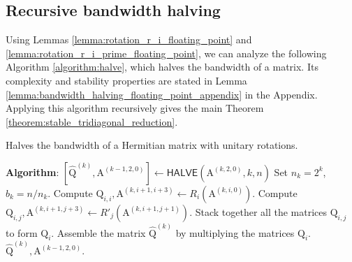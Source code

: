 \documentclass{article}
\newcommand\matA{\boldsymbol{\mathrm{A}}}
\newcommand\matQ{\boldsymbol{\mathrm{Q}}}
\newcommand\matQhat{\widehat{\boldsymbol{\mathrm{Q}}}}
\newcommand{\HALVE}{\mathsf{HALVE}}
\begin{document}
\subsection{Recursive bandwidth halving}
Using Lemmas \ref{lemma:rotation_r_i_floating_point} and \ref{lemma:rotation_r_i_prime_floating_point}, we can analyze the following Algorithm \ref{algorithm:halve}, which halves the bandwidth of a matrix. Its complexity and stability properties are stated in Lemma \ref{lemma:bandwidth_halving_floating_point_appendix} in the Appendix.
Applying this algorithm recursively gives the main Theorem \ref{theorem:stable_tridiagonal_reduction}.
\begin{algorithm}[htb]
    \caption{Halves the bandwidth of a Hermitian matrix with unitary rotations.}
    \label{algorithm:halve}
    \small
    \begin{algorithmic}[1]
        \Statex \textbf{Algorithm}: $[\matQhat^{(k)},\matA^{(k-1,2,0)}]\leftarrow \HALVE(\matA^{(k,2,0)},k,n)$
        \State Set $n_k=2^k$, $b_k=n/n_k$.
            \State Compute $\matQ_{i,i},\matA^{(k,i+1,i+3)} \leftarrow R_i(\matA^{(k,i,0)})$.
                \State Compute $\matQ_{i,j},\matA^{(k,i+1,j+3)} \leftarrow R'_j(\matA^{(k,i+1,j+1)})$.
            \EndFor
            \State Stack together all the matrices $\matQ_{i,j}$ to form $\matQ_i$.
        \EndFor
        \State Assemble the matrix $\matQhat^{(k)}$ by multiplying the matrices $\matQ_{i}$.
        \State \Return $\matQhat^{(k)},\matA^{(k-1,2,0)}$.
    \end{algorithmic}
\end{algorithm}
\end{document}
